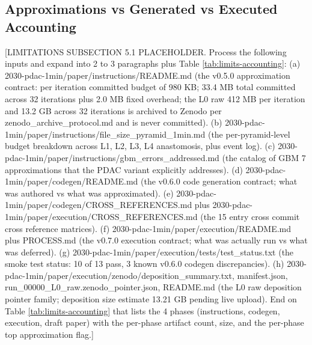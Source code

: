 %

\subsection{Approximations vs Generated vs Executed Accounting}
\label{sec:limits-accounting}

[LIMITATIONS SUBSECTION 5.1 PLACEHOLDER. Process the following inputs and expand into 2 to 3 paragraphs plus Table \ref{tab:limits-accounting}:
(a) 2030-pdac-1min/paper/instructions/README.md (the v0.5.0 approximation contract: per iteration committed budget of 980 KB; 33.4 MB total committed across 32 iterations plus 2.0 MB fixed overhead; the L0 raw 412 MB per iteration and 13.2 GB across 32 iterations is archived to Zenodo per zenodo_archive_protocol.md and is never committed).
(b) 2030-pdac-1min/paper/instructions/file_size_pyramid_1min.md (the per-pyramid-level budget breakdown across L1, L2, L3, L4 anastomosis, plus event log).
(c) 2030-pdac-1min/paper/instructions/gbm_errors_addressed.md (the catalog of GBM 7 approximations that the PDAC variant explicitly addresses).
(d) 2030-pdac-1min/paper/codegen/README.md (the v0.6.0 code generation contract; what was authored vs what was approximated).
(e) 2030-pdac-1min/paper/codegen/CROSS_REFERENCES.md plus 2030-pdac-1min/paper/execution/CROSS_REFERENCES.md (the 15 entry cross commit cross reference matrices).
(f) 2030-pdac-1min/paper/execution/README.md plus PROCESS.md (the v0.7.0 execution contract; what was actually run vs what was deferred).
(g) 2030-pdac-1min/paper/execution/tests/test_status.txt (the smoke test status: 10 of 13 pass, 3 known v0.6.0 codegen discrepancies).
(h) 2030-pdac-1min/paper/execution/zenodo/{deposition_summary.txt, manifest.json, run_00000_L0_raw.zenodo_pointer.json, README.md} (the L0 raw deposition pointer family; deposition size estimate 13.21 GB pending live upload).
End on Table \ref{tab:limits-accounting} that lists the 4 phases (instructions, codegen, execution, draft paper) with the per-phase artifact count, size, and the per-phase top approximation flag.]

